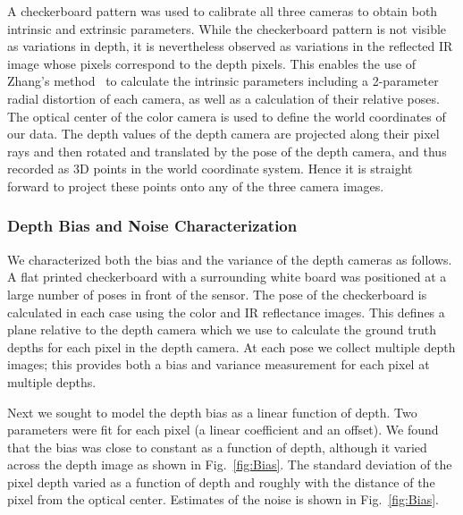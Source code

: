 A checkerboard pattern was used to calibrate all three cameras to obtain both intrinsic and extrinsic parameters.  While the checkerboard pattern is not visible as variations in depth, it is nevertheless observed as variations in the reflected IR image whose pixels correspond to the depth pixels.  This enables the use of Zhang's method~\cite{Zhang2000} to calculate the intrinsic parameters including a 2-parameter radial distortion of each camera, as well as a calculation of their relative poses.  The optical center of the color camera is used to define the world coordinates of our data.  The depth values of the depth camera are projected along their pixel rays and then rotated and translated by the pose of the depth camera, and thus recorded as 3D points in the world coordinate system.  Hence it is straight forward to project these points onto any of the three camera images.

\subsubsection{Depth Bias and Noise Characterization}
\label{sec:bias}

We characterized both the bias and the variance of the depth cameras as follows.  A flat printed checkerboard with a surrounding white board was positioned at a large number of poses in front of the sensor.  The pose of the checkerboard is calculated in each case using the color and IR reflectance images.  This defines a plane relative to the depth camera which we use to calculate the ground truth depths for each pixel in the depth camera.  At each pose we collect multiple depth images; this provides both a bias and variance measurement for each pixel at multiple depths.

Next we sought to model the depth bias as a linear function of depth.  Two parameters were fit for each pixel (a linear coefficient and an offset).  We found that the bias was close to constant as a function of depth, although it varied across the depth image as shown in Fig.~\ref{fig:Bias}.  The standard deviation of the pixel depth varied as a function of depth and roughly with the distance of the pixel from the optical center.  Estimates of the noise is shown in Fig.~\ref{fig:Bias}.

